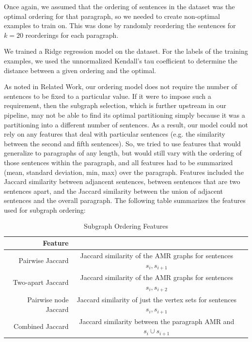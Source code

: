 \documentclass[12pt]{article}
\begin{document}
Once again, we assumed that the ordering of sentences in the dataset was the
optimal ordering for that paragraph, so we needed to create non-optimal
examples to train on. This was done by randomly reordering the sentences for
$k=20$ reorderings for each paragraph.

We trained a Ridge regression model on the dataset. For the labels of the
training examples, we used the unnormalized Kendall's tau coefficient to
determine the distance between a given ordering and the optimal.

As noted in Related Work, our ordering model does not require the number of
sentences to be fixed to a particular value. If it were to impose such a
requirement, then the subgraph selection, which is further upstream in our
pipeline, may not be able to find its optimal partitioning simply because it
was a partitioning into a different number of sentences. As a result, our model
could not rely on any features that deal with particular sentences (e.g. the
similarity between the second and fifth sentences). So, we tried to use
features that would generalize to paragraphs of any length, but would still
vary with the ordering of those sentences within the paragraph, and all
features had to be summarized (mean, standard deviation, min, max) over the
paragraph. Features included the Jaccard similarity between adjancent
sentences, between sentences that are two sentences apart, and the Jaccard
similarity between the union of adjacent sentences and the overall paragraph.
The following table summarizes the features used for subgraph ordering:

\begin{table}
\centering
\begin{tabular}{|r|c|c|}
\hline
Feature & \\ \hline\hline
Pairwise Jaccard & Jaccard similarity of the AMR graphs for sentences $s_i,s_{i+1}$ \\ \hline
Two-apart Jaccard & Jaccard similarity of the AMR graphs for sentences $s_i,s_{i+2}$ \\ \hline
Pairwise node Jaccard & Jaccard similarity of just the vertex sets for sentences $s_i,s_{i+1}$ \\ \hline
Combined Jaccard & Jaccard similarity between the paragraph AMR and $s_i \cup
s_{i+1}$ \\ \hline
\end{tabular}
\caption{Subgraph Ordering Features}
\end{table}
\end{document}
